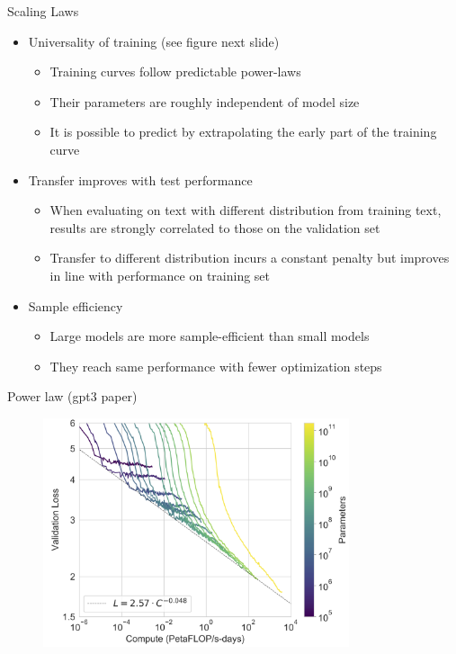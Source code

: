 \begin{vbframe}{Scaling Laws}

\vfill

\begin{itemize}

	\item Universality of training (see figure next
	slide) \qmark
	\begin{itemize}
	\item Training curves follow predictable power-laws
	\item Their parameters are roughly independent of model size
	\item It is possible to predict by extrapolating the early part of the training curve
	\end{itemize}

	\item Transfer improves with test performance \qmark
	\begin{itemize}
	\item When evaluating on text with different distribution from training text, results are strongly correlated to those on the validation set
	\item Transfer to different distribution incurs a constant penalty but improves in line with performance on training set
	\end{itemize}

	\item Sample efficiency \qmark
	\begin{itemize}
	\item Large models are more sample-efficient than small models
	\item They reach same performance with fewer optimization steps
	\end{itemize}

\end{itemize}

\vfill

\end{vbframe}


\begin{vbframe}{Power law (gpt3 paper)}

\vfill

\begin{figure}
	\centering
	\includegraphics[width = 9cm]{./figure/losscompute}
\end{figure}

\vfill

\end{vbframe}


